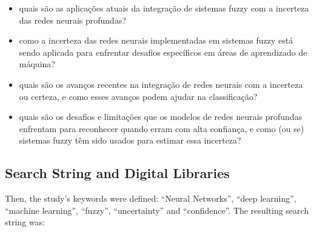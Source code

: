 \begin{itemize}
\item[1)] quais são as aplicações atuais da integração de sistemas fuzzy com a incerteza das redes neurais profundas?
\item[2)] como a incerteza das redes neurais implementadas em sistemas fuzzy está sendo aplicada para enfrentar desafios específicos em
áreas de aprendizado de máquina?
\item[3)] quais são os avanços recentes na integração de redes neurais com a incerteza ou certeza, e como esses avanços podem ajudar na
classificação?
\item[4)] quais são os desafios e limitações que os modelos de redes neurais profundas enfrentam para reconhecer quando erram com alta
confiança, e como (ou se) sistemas fuzzy têm sido usados para estimar essa incerteza?
\end{itemize}

\subsection{Search String and Digital Libraries}

Then, the study's keywords were defined: ``Neural Networks'', ``deep learning'', ``machine learning'', ``fuzzy'', ``uncertainty'' and
``confidence''. The resulting search string was:

\begin{center}
\end{center}

